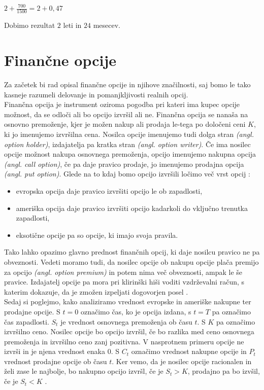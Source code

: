 \documentclass[12pt, a4paper]{amsart}
\theoremstyle{definition} %
\theoremstyle{plain} %
\begin{document}
\begin{center}
$2 + \tfrac{700}{1500} = 2 + 0,47$
\end{center}
Dobimo rezultat $2$ leti in $24$ mesecev.\\


\section{Finančne opcije}
Za začetek bi rad opisal finančne opcije in njihove značilnosti, saj bomo le tako kasneje razumeli delovanje in pomanjkljivosti realnih opcij.\\

Finančna opcija je instrument oziroma pogodba pri kateri ima kupec opcije možnost, da se odloči ali bo opcijo izvršil ali ne. Finančna opcija se nanaša na osnovno premoženje, kjer je možen nakup ali prodaja le-tega po določeni ceni $K$, ki jo imenujemo izvršilna cena. Nosilca opcije imenujemo tudi dolga stran \textit{(angl. option holder)}, izdajatelja pa kratka stran \textit{(angl. option writer)}. Če ima nosilec opcije možnost nakupa osnovnega premoženja, opcijo imenujemo nakupna opcija \textit{(angl. call option)}, če pa daje pravico prodaje, jo imenujemo prodajna opcija \textit{(angl. put option)}. Glede na to kdaj bomo opcijo izvršili ločimo več vrst opcij \cite[str. 53, 54 ]{Kosir}:
\begin{itemize}
\item evropska opcija daje pravico izvršiti opcijo le ob zapadlosti,
\item ameriška opcija daje pravico izvršiti opcijo kadarkoli do vključno trenutka zapadlosti,
\item eksotične opcije pa so opcije, ki imajo svoja pravila.
\end{itemize}
Tako lahko opazimo glavno prednost finančnih opcij, ki daje nosilcu pravico ne pa obveznosti. Vedeti moramo tudi, da nosilec opcije ob nakupu opcije plača premijo za opcijo \textit{(angl. option premium)} in potem nima več obveznosti, ampak le še pravice. Izdajatelj opcije pa mora pri klirinški hiši voditi vzdrževalni račun, s katerim dokazuje, da je zmožen izpeljati dogovorjen posel \cite[str. 54]{Kosir}.\\

Sedaj si poglejmo, kako analiziramo vrednost evropske in ameriške nakupne ter prodajne opcije. S $t=0$ označimo čas, ko je opcija izdana, s $t=T$ pa označimo čas zapadlosti. $S_t$ je vrednost osnovnega premoženja ob času $t$. S $K$ pa označimo izvršilno ceno. Nosilec opcije bo opcijo izvršil, če bo razlika med ceno osnovnega premoženja in izvršilno ceno zanj pozitivna. V nasprotnem primeru opcije ne izvrši in je njena vrednost enaka $0$. S $C_t$ označimo vrednost nakupne opcije in $P_t$ vrednost prodajne opcije ob času $t$. Ker vemo, da je nosilec opcije racionalen in želi zase le najbolje, bo nakupno opcijo izvršl, če je $S_t > K$, prodajno pa bo izvšil, če je $S_t < K$ \cite[str. 54-58]{Kosir}.\\
\end{document}
